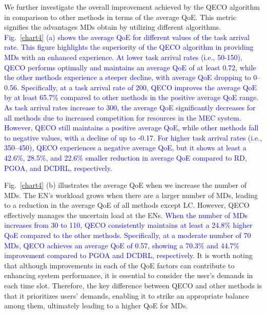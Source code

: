 \documentclass[10pt, journal,letterpaper]{IEEEtran}
\begin{document}
We further investigate the overall improvement achieved by the QECO algorithm in comparison to other methods in terms of the average QoE. This metric signifies the advantages MDs obtain by utilizing different algorithms. \textcolor{blue}{Fig.~\ref{chart4} (a) shows the average QoE for different values of the task arrival rate. This figure highlights the superiority of the QECO algorithm in providing MDs with an enhanced experience. At lower task arrival rates (i.e., 50-150), QECO performs optimally and maintains an average QoE of at least 0.72, while the other methods experience a steeper decline, with average QoE dropping to 0--0.56. Specifically, at a task arrival rate of 200, QECO improves the average QoE by at least 65.7\% compared to other methods in the positive average QoE range. As task arrival rates increase to 300, the average QoE significantly decreases for all methods due to increased competition for resources in the MEC system. However, QECO still maintains a positive average QoE, while other methods fall to negative values, with a decline of up to -0.17. For higher task arrival rates (i.e., 350–450), QECO experiences a negative average QoE, but it shows at least a 42.6\%, 28.5\%, and 22.6\% smaller reduction in average QoE compared to RD, PGOA, and DCDRL, respectively.}



 Fig.~\ref{chart4} (b) illustrates the average QoE when we increase the number of MDs. The EN's workload grows when there are a larger number of MDs, leading to a reduction in the average QoE of all methods except LC. However, QECO effectively manages the uncertain load at the ENs. \textcolor{blue}{When the number of MDs increases from 30 to 110, QECO consistently maintains at least a 24.8\% higher QoE compared to the other methods. Specifically, at a moderate number of 70 MDs, QECO achieves an average QoE of 0.57, showing a 70.3\% and 44.7\% improvement compared to PGOA and DCDRL, respectively.} It is worth noting that although improvements in each of the QoE factors can contribute to enhancing system performance, it is essential to consider the user's demands in each time slot. Therefore, the key difference between QECO and other methods is that it prioritizes users' demands, enabling it to strike an appropriate balance among them, ultimately leading to a higher QoE for MDs.
\end{document}
